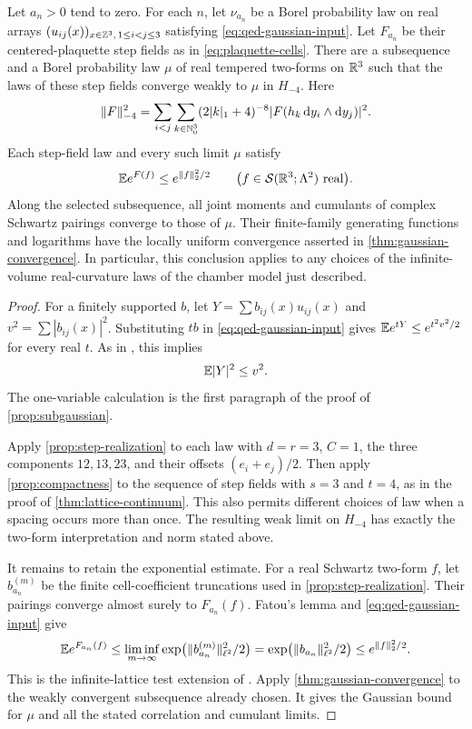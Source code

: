 \begin{corollary}\label{cor:qed-continuum}
Let $a_n>0$ tend to zero. For each $n$, let $\nu_{a_n}$ be
a Borel probability law on real arrays
$(u_{ij}(x))_{x\in\mathbb Z^3,\,1\le i<j\le3}$ satisfying
\eqref{eq:qed-gaussian-input}. Let \(F_{a_n}\) be their centered-plaquette step fields as in \eqref{eq:plaquette-cells}.
There are a subsequence and a Borel probability law $\mu$ of
real tempered two-forms on $\mathbb R^3$ such that the laws of these
step fields converge weakly to $\mu$ in $H_{-4}$. Here
\[
 \|F\|_{-4}^2=\sum_{i<j}\sum_{k\in\mathbb N_0^3}
       (2|k|_1+4)^{-8}|F(h_k\,\mathrm d y_i\wedge\mathrm d y_j)|^2.
\]
Each step-field law and every such limit $\mu$ satisfy
\[
 \mathbb E e^{F(f)}\le e^{\|f\|_2^2/2}
 \qquad\bigl(f\in\mathcal S(\mathbb R^3;\Lambda^2)\text{ real}\bigr).
\]
Along the selected subsequence, all joint moments and cumulants
of complex Schwartz pairings converge to those of $\mu$.
Their finite-family generating functions and logarithms have
the locally uniform convergence asserted in
\cref{thm:gaussian-convergence}.
In particular, this conclusion applies to any choices of the
infinite-volume real-curvature laws of the chamber model just
described.
\end{corollary}

\begin{proof}
For a finitely supported $b$, let $Y=\sum b_{ij}(x)u_{ij}(x)$
and $v^2=\sum|b_{ij}(x)|^2$. Substituting $tb$ in
\eqref{eq:qed-gaussian-input} gives
$\mathbb E e^{tY}\le e^{t^2v^2/2}$ for every real $t$.
As in \cite[Proposition~5.1]{QED3Manuscript}, this implies
\begin{equation}\label{eq:qed-second-input}
 \mathbb E|Y|^2\le v^2.
\end{equation}
The one-variable calculation is the first paragraph of the
proof of \cref{prop:subgaussian}.

Apply \cref{prop:step-realization} to each law with $d=r=3$,
$C=1$, the three components $12,13,23$, and their offsets
$(e_i+e_j)/2$. Then apply \cref{prop:compactness} to the sequence
of step fields with $s=3$ and $t=4$, as in the proof of
\cref{thm:lattice-continuum}. This also permits different choices
of law when a spacing occurs more than once.
The resulting weak limit on $H_{-4}$ has exactly the
two-form interpretation and norm stated above.

It remains to retain the exponential estimate. For a real
Schwartz two-form $f$, let $b_{a_n}^{(m)}$ be the finite
cell-coefficient truncations used in
\cref{prop:step-realization}. Their pairings converge almost
surely to $F_{a_n}(f)$. Fatou's lemma and
\eqref{eq:qed-gaussian-input} give
\[
 \mathbb E e^{F_{a_n}(f)}
 \le\liminf_{m\to\infty}
        \exp\bigl(\|b_{a_n}^{(m)}\|_{\ell^2}^2/2\bigr)
 =\exp\bigl(\|b_{a_n}\|_{\ell^2}^2/2\bigr)
 \le e^{\|f\|_2^2/2}.
\]
This is the infinite-lattice test extension of
\cite[Section~6.1]{LatticeLimits}. Apply
\cref{thm:gaussian-convergence} to the weakly convergent
subsequence already chosen. It gives the Gaussian bound for
$\mu$ and all the stated correlation and cumulant limits.
\end{proof}


